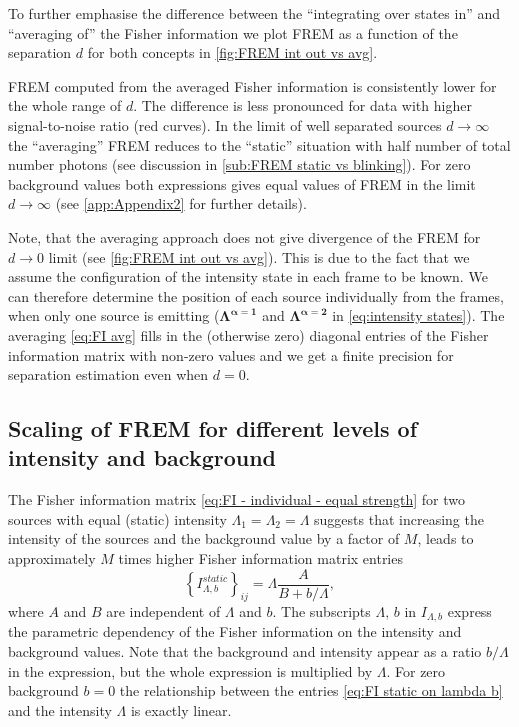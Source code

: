 To further emphasise the difference between the ``integrating over states in'' and ``averaging of'' the Fisher information we plot FREM as a function of the separation $d$ for both concepts in \autoref{fig:FREM int out vs avg}.

FREM computed from the averaged Fisher information is consistently lower for the whole range of $d$. The difference is less pronounced for data with higher signal-to-noise ratio (red curves). In the limit of well separated sources $d\rightarrow\infty$ the ``averaging'' FREM reduces to the ``static'' situation with half number of total number photons (see discussion in \autoref{sub:FREM static vs blinking}). For zero background values both expressions gives equal values of FREM in the limit $d\rightarrow\infty$ (see \autoref{app:Appendix2} for further details).

Note, that the averaging approach does not give divergence of the FREM for $d\rightarrow 0$ limit (see \autoref{fig:FREM int out vs avg}\aaa). This is due to the fact that we assume the configuration of the intensity state in each frame to be known. We can therefore determine the position of each source individually from the frames, when only one source is emitting ($\bm{\Lambda^{\alpha=1}}$ and $\bm{\Lambda^{\alpha=2}}$ in \autoref{eq:intensity states}). The averaging \autoref{eq:FI avg} fills in the (otherwise zero) diagonal entries of the Fisher information matrix with non-zero values and we get a finite precision for separation estimation even when $d=0$.


\subsection{Scaling of FREM for different levels of intensity and background\label{sub:scaling}}

The Fisher information matrix \autoref{eq:FI - individual - equal strength} for two sources with equal (static) intensity $\Lambda_1=\Lambda_2=\Lambda$ suggests that increasing the intensity of the sources and the background value by a factor of $M$, leads to approximately $M$ times higher Fisher information matrix entries
%
\begin{equation}
	\left\{I_{\Lambda,b}^{static}\right\}_{ij}=\Lambda\frac{A}{B+b/\Lambda},
	\label{eq:FI static on lambda b}
\end{equation}
%
where $A$ and $B$ are independent of $\Lambda$ and $b$. The subscripts $\Lambda,\,b$ in $I_{\Lambda,b}$ express the parametric dependency of the Fisher information on the intensity and background values.  Note that the background and intensity appear as a ratio $b/\Lambda$ in the expression, but the whole expression is multiplied by $\Lambda$. For zero background $b=0$ the relationship between the entries \autoref{eq:FI static on lambda b} and the intensity $\Lambda$ is exactly linear. 

